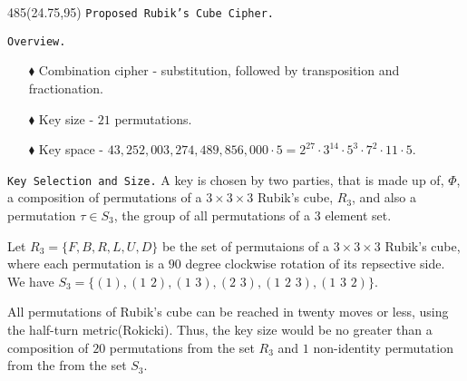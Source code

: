 \documentclass{beamer}%
\begin{document}
\begin{textblock}{485}(24.75,95)
	{\centering \Large \Huge\texttt{Proposed Rubik's Cube Cipher.}}
	\begin{block}{\texttt{Overview.}}
		\begin{itemize}
			\item [$\blacklozenge$] Combination cipher - substitution, followed by transposition and fractionation.
			\item [$\blacklozenge$] Key size - $21$ permutations.
			\item [$\blacklozenge$] Key space - $43,252,003,274,489,856,000\cdot 5=2^{27}\cdot 3^{14}\cdot 5^{3}\cdot 7^{2}\cdot 11\cdot 5$.
		\end{itemize}
	\end{block}
	\begin{block}{\texttt{Key Selection and Size.}}
		A key is chosen by two parties, that is made up of, $\Phi$, a composition of permutations of a $3\times 3\times 3$ Rubik's cube, $R_{3}$, and also a permutation $\tau\in S_{3}$, the group of all permutations of a $3$ element set.
		
		Let $R_{3}=\{F,B,R,L,U,D\}$ be the set of permutaions of a $3\times 3\times 3$ Rubik's cube, where each permutation is a $90$ degree clockwise rotation of its repsective side.\\
		We have $S_{3}=\{(1),(1\,\,2), (1\,\,3), (2\,\,3),(1\,\,2\,\,3),(1\,\,3\,\,2)\}$.
		
		All permutations of Rubik's cube can be reached in twenty moves or less, using the half-turn metric(Rokicki). Thus, the key size would be no greater than a composition of $20$ permutations from the set $R_{3}$ and $1$ non-identity permutation from the from the set $S_{3}$.
	\end{block}


\end{textblock}
\end{document}
